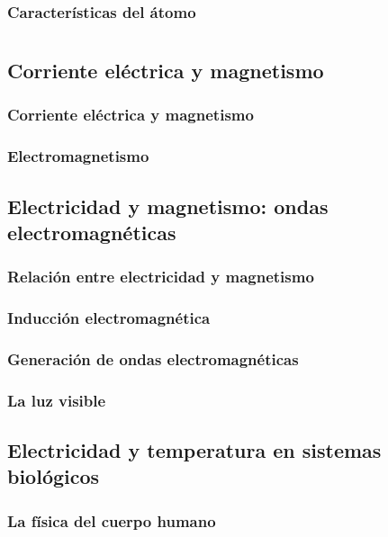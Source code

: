 \documentclass[11pt]{book}
\begin{document}
\subsection{Caracter\'isticas del \'atomo}
\newpage \thispagestyle{plain}
\chapter{}

\newpage \thispagestyle{plain}
\section{ Corriente el\'ectrica y magnetismo}
\subsection{Corriente el\'ectrica y magnetismo}
\subsection{Electromagnetismo}

\newpage \thispagestyle{plain}
\section{ Electricidad y magnetismo: ondas electromagn\'eticas}
\subsection{Relaci\'on entre electricidad y magnetismo}
\subsection{Inducci\'on electromagn\'etica}
\subsection{Generaci\'on de ondas electromagn\'eticas}
\subsection{La luz visible}
\newpage \thispagestyle{plain}
\section{ Electricidad y temperatura en sistemas biol\'ogicos}
\subsection{La f\'isica del cuerpo humano}
\newpage \thispagestyle{plain}
\end{document}
